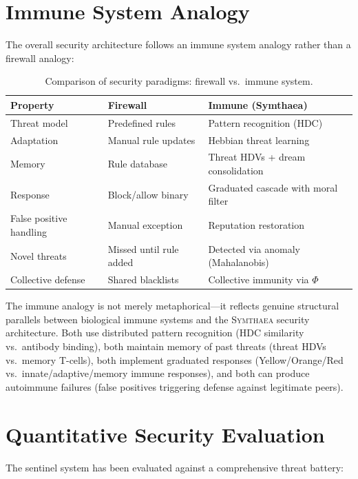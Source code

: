 \documentclass[12pt]{book}
\newcommand{\symthaea}{\textsc{Symthaea}}
\begin{document}
\section{Immune System Analogy}

The overall security architecture follows an immune system analogy rather than a firewall analogy:

\begin{table}[H]
\centering
\caption{Comparison of security paradigms: firewall vs.\ immune system.}
\label{tab:security-paradigm}
\begin{tabular}{lll}
\toprule
\textbf{Property} & \textbf{Firewall} & \textbf{Immune (Symthaea)} \\
\midrule
Threat model & Predefined rules & Pattern recognition (HDC) \\
Adaptation & Manual rule updates & Hebbian threat learning \\
Memory & Rule database & Threat HDVs + dream consolidation \\
Response & Block/allow binary & Graduated cascade with moral filter \\
False positive handling & Manual exception & Reputation restoration \\
Novel threats & Missed until rule added & Detected via anomaly (Mahalanobis) \\
Collective defense & Shared blacklists & Collective immunity via $\Phi$ \\
\bottomrule
\end{tabular}
\end{table}

The immune analogy is not merely metaphorical---it reflects genuine structural parallels between biological immune systems and the \symthaea{} security architecture. Both use distributed pattern recognition (HDC similarity vs.\ antibody binding), both maintain memory of past threats (threat HDVs vs.\ memory T-cells), both implement graduated responses (Yellow/Orange/Red vs.\ innate/adaptive/memory immune responses), and both can produce autoimmune failures (false positives triggering defense against legitimate peers).

\section{Quantitative Security Evaluation}

The sentinel system has been evaluated against a comprehensive threat battery:
\end{document}
